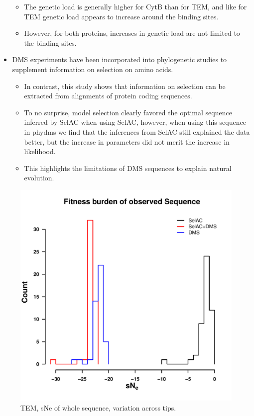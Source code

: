 \documentclass[12pt]{article}
\begin{document}
\begin{itemize}
\begin{itemize}
		\item The genetic load is generally higher for CytB than for TEM, and like for TEM genetic load appears to increase around the binding sites.
		\item However, for both proteins, increases in genetic load are not limited to the binding sites.
	\end{itemize}
	\item DMS experiments have been incorporated into phylogenetic studies to supplement information on selection on amino acids.
	\begin{itemize}
		\item In contrast, this study shows that information on selection can be extracted from alignments of protein coding sequences.
		\item To no surprise, model selection clearly favored the optimal sequence inferred by SelAC when using SelAC, however, when using this sequence in phydms we find that the inferences from SelAC still explained the data better, but the increase in parameters did not merit the increase in likelihood.
		\item This highlights the limitations of DMS sequences to explain natural evolution.
	\end{itemize}

\end{itemize}

\begin{figure}[H]
     \centering
	\includegraphics[width=\textwidth]{img/sNe_TEM2016}
	\caption{TEM, sNe of whole sequence, variation across tips.}
	\label{fig:sne_tem2016}
\end{figure}
\end{document}

